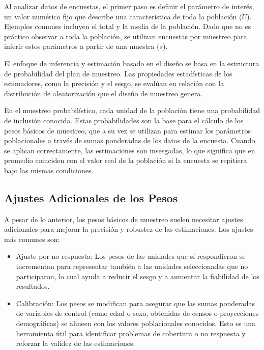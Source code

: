 \documentclass[
  12pt,
]{book}
\providecommand{\tightlist}{%
  \setlength{\itemsep}{0pt}\setlength{\parskip}{0pt}}
\begin{document}
Al analizar datos de encuestas, el primer paso es definir el parámetro de interés, un valor numérico fijo que describe una característica de toda la población (\(U\)). Ejemplos comunes incluyen el total y la media de la población. Dado que no es práctico observar a toda la población, se utilizan encuestas por muestreo para inferir estos parámetros a partir de una muestra (\(s\)).

El enfoque de inferencia y estimación basado en el diseño se basa en la estructura de probabilidad del plan de muestreo. Las propiedades estadísticas de los estimadores, como la precisión y el sesgo, se evalúan en relación con la distribución de aleatorización que el diseño de muestreo genera.

En el muestreo probabilístico, cada unidad de la población tiene una probabilidad de inclusión conocida. Estas probabilidades son la base para el cálculo de los pesos básicos de muestreo, que a su vez se utilizan para estimar los parámetros poblacionales a través de sumas ponderadas de los datos de la encuesta. Cuando se aplican correctamente, las estimaciones son insesgadas, lo que significa que en promedio coinciden con el valor real de la población si la encuesta se repitiera bajo las mismas condiciones.

\subsection{Ajustes Adicionales de los Pesos}\label{ajustes-adicionales-de-los-pesos}

A pesar de lo anterior, los pesos básicos de muestreo suelen necesitar ajustes adicionales para mejorar la precisión y robustez de las estimaciones. Los ajustes más comunes son:

\begin{itemize}
\tightlist
\item
  Ajuste por no respuesta: Los pesos de las unidades que sí respondieron se incrementan para representar también a las unidades seleccionadas que no participaron, lo cual ayuda a reducir el sesgo y a aumentar la fiabilidad de los resultados.
\item
  Calibración: Los pesos se modifican para asegurar que las sumas ponderadas de variables de control (como edad o sexo, obtenidas de censos o proyecciones demográficas) se alineen con los valores poblacionales conocidos. Esto es una herramienta útil para identificar problemas de cobertura o no respuesta y reforzar la validez de las estimaciones.
\end{itemize}
\end{document}

